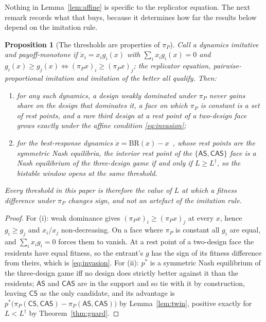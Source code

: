 \documentclass[11pt,a4paper]{article}
\newtheorem{proposition}[theorem]{Proposition}
\theoremstyle{definition}
\newcommand{\AS}{\textsf{AS}}
\newcommand{\CS}{\textsf{CS}}
\newcommand{\CAS}{\textsf{CAS}}
\newcommand{\piP}{\pi_{P}}
\begin{document}
Nothing in Lemma~\ref{lem:affine} is specific to the replicator equation. The
next remark records what that buys, because it determines how far the results
below depend on the imitation rule.

\begin{proposition}[The thresholds are properties of $\piP$]\label{prop:dynfree}
Call a dynamics \emph{imitative and payoff-monotone} if
$\dot{x}_i=x_i g_i(x)$ with $\sum_i x_i g_i(x)=0$ and
$g_i(x)\ge g_j(x)\iff(\piP x)_i\ge(\piP x)_j$; the replicator equation,
pairwise-proportional imitation and imitation of the better all qualify. Then:
\begin{enumerate}
\item[(i)] for any such dynamics, a design weakly dominated under $\piP$ never
gains share on the design that dominates it, a face on which $\piP$ is
constant is a set of rest points, and a rare third design at a rest point of a
two-design face grows exactly under the affine condition \eqref{eq:invasion};
\item[(ii)] for the best-response dynamics $\dot{x}=\mathrm{BR}(x)-x$~\citep{gilboa1991social,matsui1992best}, whose
rest points are the symmetric Nash equilibria, the interior rest point of the
$\{\AS,\CAS\}$ face is a Nash equilibrium of the three-design game if and only
if $L\ge L^{\dagger}$, so the bistable window opens at the same threshold.
\end{enumerate}
Every threshold in this paper is therefore the value of $L$ at which a fitness
difference under $\piP$ changes sign, and not an artefact of the imitation
rule.
\end{proposition}

\begin{proof}
For (i): weak dominance gives $(\piP x)_i\ge(\piP x)_j$ at every $x$, hence
$g_i\ge g_j$ and $x_i/x_j$ non-decreasing. On a face where $\piP$ is constant
all $g_i$ are equal, and $\sum_i x_ig_i=0$ forces them to vanish. At a rest
point of a two-design face the residents have equal fitness, so the entrant's
$g$ has the sign of its fitness difference from theirs, which is
\eqref{eq:invasion}. For (ii): $p^{*}$ is a symmetric Nash equilibrium of the
three-design game iff no design does strictly better against it than the
residents; $\AS$ and $\CAS$ are in the support and so tie with it by
construction, leaving $\CS$ as the only candidate, and its advantage is
$p^{*}\big(\piP(\CS,\CAS)-\piP(\AS,\CAS)\big)$ by Lemma~\ref{lem:twin},
positive exactly for $L<L^{\dagger}$ by Theorem~\ref{thm:guard}.
\end{proof}
\end{document}
